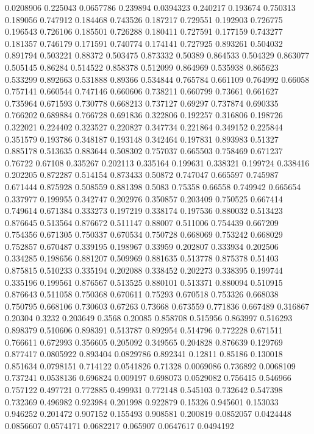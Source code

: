 0.0208906 0.225043
0.0657786 0.239894
0.0394323 0.240217
0.193674 0.750313
0.189056 0.747912
0.184468 0.743526
0.187217 0.729551
0.192903 0.726775
0.196543 0.726106
0.185501 0.726288
0.180411 0.727591
0.177159 0.743277
0.181357 0.746179
0.171591 0.740774
0.174141 0.727925
0.893261 0.504032
0.891794 0.503221
0.88372 0.503475
0.873332 0.50389
0.864533 0.504329
0.863077 0.505145
0.86284 0.514522
0.858378 0.512099
0.864969 0.535938
0.865623 0.533299
0.892663 0.531888
0.89366 0.534844
0.765784 0.661109
0.764992 0.66058
0.757141 0.660544
0.747146 0.660606
0.738211 0.660799
0.73661 0.661627
0.735964 0.671593
0.730778 0.668213
0.737127 0.69297
0.737874 0.690335
0.766202 0.689884
0.766728 0.691836
0.322806 0.192257
0.316806 0.198726
0.322021 0.224402
0.323527 0.220827
0.347734 0.221864
0.349152 0.225844
0.351579 0.193786
0.348187 0.193148
0.342464 0.197831
0.893983 0.51327
0.885178 0.513635
0.883644 0.508302
0.757037 0.665503
0.758469 0.671237
0.76722 0.67108
0.335267 0.202113
0.335164 0.199631
0.338321 0.199724
0.338416 0.202205
0.872287 0.514154
0.873433 0.50872
0.747047 0.665597
0.745987 0.671444
0.875928 0.508559
0.881398 0.5083
0.75358 0.66558
0.749942 0.665654
0.337977 0.199955
0.342747 0.202976
0.350857 0.203409
0.750525 0.667414
0.749614 0.671384
0.333273 0.197219
0.338174 0.197536
0.880032 0.513423
0.876645 0.513564
0.876672 0.511147
0.88007 0.511006
0.754439 0.667209
0.754356 0.671305
0.750337 0.670534
0.750728 0.668069
0.753242 0.668029
0.752857 0.670487
0.339195 0.198967
0.33959 0.202807
0.333934 0.202506
0.334285 0.198656
0.881207 0.509969
0.881635 0.513778
0.875378 0.51403
0.875815 0.510233
0.335194 0.202088
0.338452 0.202273
0.338395 0.199744
0.335196 0.199561
0.876567 0.513525
0.880101 0.513371
0.880094 0.510915
0.876643 0.511058
0.750368 0.670611
0.75293 0.670518
0.753326 0.668038
0.750795 0.668106
0.730603 0.67263
0.73668 0.673559
0.771836 0.667489
0.316867 0.20304
0.3232 0.203649
0.3568 0.20085
0.858708 0.515956
0.863997 0.516293
0.898379 0.510606
0.898391 0.513787
0.892954 0.514796
0.772228 0.671511
0.766611 0.672993
0.356605 0.205092
0.349565 0.204828
0.876639 0.129769
0.877417 0.0805922
0.893404 0.0829786
0.892341 0.12811
0.85186 0.130018
0.851634 0.0798151
0.714122 0.0541826
0.71328 0.0069086
0.736892 0.0068109
0.737241 0.0538136
0.696824 0.009197
0.698073 0.0529082
0.756415 0.546966
0.757122 0.497721
0.772885 0.499931
0.772148 0.545103
0.732642 0.547398
0.732369 0.496982
0.923984 0.201998
0.922879 0.15326
0.945601 0.153033
0.946252 0.201472
0.907152 0.155493
0.908581 0.200819
0.0852057 0.0424448
0.0856607 0.0574171
0.0682217 0.065907
0.0647617 0.0494192
